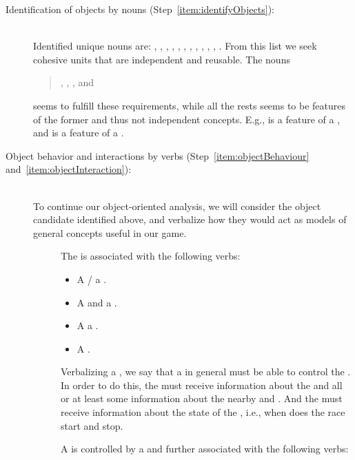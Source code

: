 \begin{description}
\item[Identification of objects by nouns (Step~\ref{item:identifyObjects}):]~\\
  Identified unique nouns are: , , , , , , , , , , , . From this list we seek cohesive units that are independent and reusable. The nouns
  \begin{quote}
    , , , and 
  \end{quote}
  seems to fulfill these requirements, while all the rests seems to be features of the former and thus not independent concepts. E.g.,  is a feature of a , and  is a feature of a .
\item[Object behavior and interactions by verbs (Step~\ref{item:objectBehaviour}  and~\ref{item:objectInteraction}):]~\\
  To continue our object-oriented analysis, we will consider the object candidate identified above, and verbalize how they would act as models of general concepts useful in our game.
\begin{description}
\item[] The  is associated with the following verbs:
  \begin{itemize}
  \item A  / a . 
  \item A   and  a .
  \item A   a . 
  \item A  . 
  \end{itemize}
  Verbalizing a , we say that a  in general must be able to control the . In order to do this, the  must receive information about the  and all  or at least some information about the nearby  and . And the  must receive information about the state of the , i.e., when does the race start and stop.
\item[] A  is controlled by a  and further associated with the following verbs:

\end{description}
\end{description}
